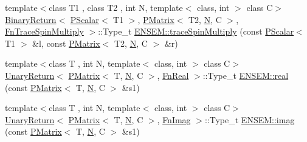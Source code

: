 \begin{DoxyCompactItemize}
\item 
{\footnotesize template$<$class T1 , class T2 , int N, template$<$ class, int $>$ class C$>$ }\\\mbox{\hyperlink{structENSEM_1_1BinaryReturn}{Binary\+Return}}$<$ \mbox{\hyperlink{classENSEM_1_1PScalar}{P\+Scalar}}$<$ T1 $>$, \mbox{\hyperlink{classENSEM_1_1PMatrix}{P\+Matrix}}$<$ T2, \mbox{\hyperlink{operator__name__util_8cc_a7722c8ecbb62d99aee7ce68b1752f337}{N}}, C $>$, \mbox{\hyperlink{structENSEM_1_1FnTraceSpinMultiply}{Fn\+Trace\+Spin\+Multiply}} $>$\+::Type\+\_\+t \mbox{\hyperlink{group__primmatrix_gafb9febbc048f38bb6e1dc7d60d8dde8d}{E\+N\+S\+E\+M\+::trace\+Spin\+Multiply}} (const \mbox{\hyperlink{classENSEM_1_1PScalar}{P\+Scalar}}$<$ T1 $>$ \&l, const \mbox{\hyperlink{classENSEM_1_1PMatrix}{P\+Matrix}}$<$ T2, \mbox{\hyperlink{operator__name__util_8cc_a7722c8ecbb62d99aee7ce68b1752f337}{N}}, C $>$ \&r)
\item 
{\footnotesize template$<$class T , int N, template$<$ class, int $>$ class C$>$ }\\\mbox{\hyperlink{structENSEM_1_1UnaryReturn}{Unary\+Return}}$<$ \mbox{\hyperlink{classENSEM_1_1PMatrix}{P\+Matrix}}$<$ T, \mbox{\hyperlink{operator__name__util_8cc_a7722c8ecbb62d99aee7ce68b1752f337}{N}}, C $>$, \mbox{\hyperlink{structENSEM_1_1FnReal}{Fn\+Real}} $>$\+::Type\+\_\+t \mbox{\hyperlink{group__primmatrix_ga5d6f44c46b47f8dc972b40a518058e0e}{E\+N\+S\+E\+M\+::real}} (const \mbox{\hyperlink{classENSEM_1_1PMatrix}{P\+Matrix}}$<$ T, \mbox{\hyperlink{operator__name__util_8cc_a7722c8ecbb62d99aee7ce68b1752f337}{N}}, C $>$ \&s1)
\item 
{\footnotesize template$<$class T , int N, template$<$ class, int $>$ class C$>$ }\\\mbox{\hyperlink{structENSEM_1_1UnaryReturn}{Unary\+Return}}$<$ \mbox{\hyperlink{classENSEM_1_1PMatrix}{P\+Matrix}}$<$ T, \mbox{\hyperlink{operator__name__util_8cc_a7722c8ecbb62d99aee7ce68b1752f337}{N}}, C $>$, \mbox{\hyperlink{structENSEM_1_1FnImag}{Fn\+Imag}} $>$\+::Type\+\_\+t \mbox{\hyperlink{group__primmatrix_ga0e708a122654c3ad8295f071a5857abb}{E\+N\+S\+E\+M\+::imag}} (const \mbox{\hyperlink{classENSEM_1_1PMatrix}{P\+Matrix}}$<$ T, \mbox{\hyperlink{operator__name__util_8cc_a7722c8ecbb62d99aee7ce68b1752f337}{N}}, C $>$ \&s1)
\item 

\end{DoxyCompactItemize}
